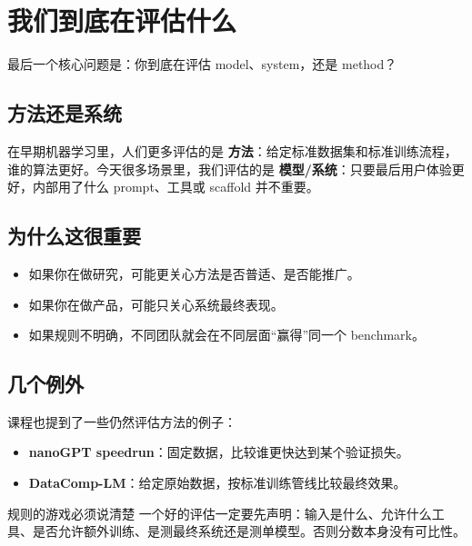 \section{我们到底在评估什么}

最后一个核心问题是：你到底在评估 model、system，还是 method？

\subsection{方法还是系统}

在早期机器学习里，人们更多评估的是 \textbf{方法}：给定标准数据集和标准训练流程，谁的算法更好。今天很多场景里，我们评估的是 \textbf{模型/系统}：只要最后用户体验更好，内部用了什么 prompt、工具或 scaffold 并不重要。

\subsection{为什么这很重要}

\begin{itemize}
    \item 如果你在做研究，可能更关心方法是否普适、是否能推广。
    \item 如果你在做产品，可能只关心系统最终表现。
    \item 如果规则不明确，不同团队就会在不同层面“赢得”同一个 benchmark。
\end{itemize}

\subsection{几个例外}

课程也提到了一些仍然评估方法的例子：

\begin{itemize}
    \item \textbf{nanoGPT speedrun}：固定数据，比较谁更快达到某个验证损失。
    \item \textbf{DataComp-LM}：给定原始数据，按标准训练管线比较最终效果。
\end{itemize}

\begin{importantbox}{规则的游戏必须说清楚}
一个好的评估一定要先声明：输入是什么、允许什么工具、是否允许额外训练、是测最终系统还是测单模型。否则分数本身没有可比性。
\end{importantbox}

